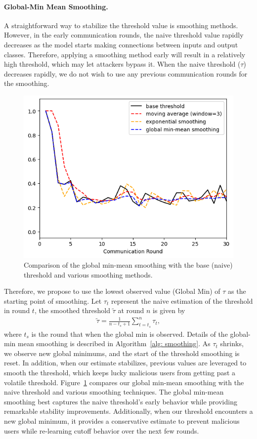 \documentclass{article} %
\begin{document}
\paragraph{Global-Min Mean Smoothing.} 
A straightforward way to stabilize the threshold value is smoothing methods. However, in the early communication rounds, the naive threshold value rapidly decreases as the model starts making connections between inputs and output classes. Therefore, applying a smoothing method early will result in a relatively high threshold, which may let attackers bypass it. When the naive threshold ($\tau$) decreases rapidly, we do not wish to use any previous communication rounds for the smoothing. 

\pagedepth\maxdimen
\begin{figure}
    \includegraphics[width=.4\textwidth]{make_article/make_visuals/visuals/smoothing--d_rounds30.png}
    \caption{\footnotesize Comparison of the global min-mean smoothing with the base (naive) threshold and various smoothing methods. 
    }
    \label{fig: smoothing}
\end{figure}

Therefore, we propose to use the lowest observed value (Global Min) of $\tau$ as the starting point of smoothing. Let $\tau_t$ represent the naive estimation of the threshold in round $t$, the smoothed threshold $\tilde{\tau}$ at round $n$ is given by
\begin{align*}
    \tilde{\tau} = \frac{1}{n-t_s+1}\sum_{t=t_s}^n \tau_t,
\end{align*}
where $t_s$ is the round that when the global min is observed. Details of the global-min mean smoothing is described in Algorithm~\ref{alg: smoothing}. As $\tau_t$ shrinks, we observe new global minimums, and the start of the threshold smoothing is reset.  In addition, when our estimate stabilizes, previous values are leveraged to smooth the threshold, which keeps lucky malicious users from getting past a volatile threshold. Figure~\ref{fig: smoothing} compares our global min-mean smoothing with the naive threshold and various smoothing techniques. The global min-mean smoothing best captures the naive threshold's early behavior while providing remarkable stability improvements. Additionally, when our threshold encounters a new global minimum, it provides a conservative estimate to prevent malicious users while re-learning cutoff behavior over the next few rounds.
\end{document}
